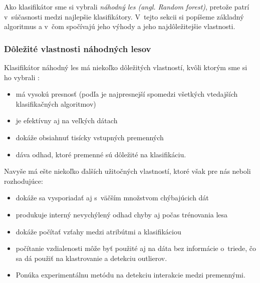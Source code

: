 

Ako klasifikátor sme si vybrali \textit{náhodný les (angl. Random forest)}, pretože patrí v~súčasnosti medzi najlepšie klasifikátory. V~tejto sekcii si popíšeme základný algoritmus a v~čom spočívajú jeho výhody a jeho najdôležitejšie vlastnosti.

\subsubsection[Dôležité vlastnosti]{Dôležité vlastnosti náhodných lesov}
Klasifikátor náhodný les má niekoľko dôležitých vlastností, kvôli ktorým sme si ho vybrali \cite{randomForest}:
\begin{itemize}
\item má vysokú presnosť (podľa \cite{randomForest} je najpresnejší spomedzi všetkých vtedajších klasifikačných algoritmov)
\item je efektívny aj na veľkých dátach
\item dokáže obsiahnuť tisícky vstupných premenných
\item dáva odhad, ktoré premenné sú dôležité na klasifikáciu.
\end{itemize}

Navyše má ešte niekoľko ďalších užitočných vlastností, ktoré však pre nás neboli rozhodujúce\cite{randomForest}:

\begin{itemize}
\item dokáže sa vysporiadať aj s~väčším množstvom chýbajúcich dát
\item produkuje interný nevychýlený odhad chyby aj počas trénovania lesa
\item dokáže počítať vzťahy medzi atribútmi a klasifikáciou
\item počítanie vzdialenosti môže byť použité aj na dáta bez informácie o~triede, čo sa dá použiť na klastrovanie a detekciu outlierov.
\item Ponúka experimentálnu metódu na detekciu interakcie medzi premennými.
\end{itemize}

